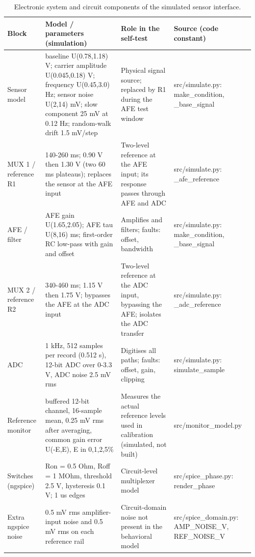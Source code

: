 
\begin{table}[H]
\caption{Electronic system and circuit components of the simulated sensor interface.\label{tab:table01_system_components}}
\centering
\footnotesize
\begin{tabular}{p{3.2cm}p{3.6cm}p{3.6cm}p{3.6cm}}
\toprule
\textbf{Block} & \textbf{Model / parameters (simulation)} & \textbf{Role in the self-test} & \textbf{Source (code constant)} \\
\midrule
Sensor model & baseline U(0.78,1.18) V; carrier amplitude U(0.045,0.18) V; frequency U(0.45,3.0) Hz; sensor noise U(2,14) mV; slow component 25 mV at 0.12 Hz; random-walk drift 1.5 mV/step & Physical signal source; replaced by R1 during the AFE test window & src/simulate.py: make\_condition, \_base\_signal \\
MUX 1 / reference R1 & 140-260 ms; 0.90 V then 1.30 V (two 60 ms plateaus); replaces the sensor at the AFE input & Two-level reference at the AFE input; its response passes through AFE and ADC & src/simulate.py: \_afe\_reference \\
AFE / filter & AFE gain U(1.65,2.05); AFE tau U(8,16) ms; first-order RC low-pass with gain and offset & Amplifies and filters; faults: offset, bandwidth & src/simulate.py: make\_condition, \_base\_signal \\
MUX 2 / reference R2 & 340-460 ms; 1.15 V then 1.75 V; bypasses the AFE at the ADC input & Two-level reference at the ADC input, bypassing the AFE; isolates the ADC transfer & src/simulate.py: \_adc\_reference \\
ADC & 1 kHz, 512 samples per record (0.512 s), 12-bit ADC over 0-3.3 V, ADC noise 2.5 mV rms & Digitises all paths; faults: offset, gain, clipping & src/simulate.py: simulate\_sample \\
Reference monitor & buffered 12-bit channel, 16-sample mean, 0.25 mV rms after averaging, common gain error U(-E,E), E in {0,1,2,5}\% & Measures the actual reference levels used in calibration (simulated, not built) & src/monitor\_model.py \\
Switches (ngspice) & Ron = 0.5 Ohm, Roff = 1 MOhm, threshold 2.5 V, hysteresis 0.1 V; 1 us edges & Circuit-level multiplexer model & src/spice\_phase.py: render\_phase \\
Extra ngspice noise & 0.5 mV rms amplifier-input noise and 0.5 mV rms on each reference rail & Circuit-domain noise not present in the behavioral model & src/spice\_domain.py: AMP\_NOISE\_V, REF\_NOISE\_V \\

\end{tabular}
\end{table}
